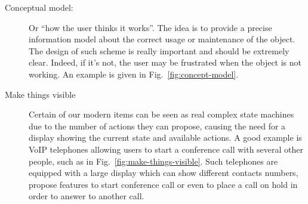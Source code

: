 \documentclass[a4paper,11pt] {article}
\theoremstyle{definition}
\begin{document}
\begin{description}
    \item [Conceptual model:] Or ``how the user thinks it works''. The idea is to provide a precise information model about the correct usage or maintenance of the object. The design of such scheme is really important and should be extremely clear. Indeed, if it's not, the user may be frustrated when the object is not working. An example is given in Fig.~\ref{fig:concept-model}.

    \item [Make things visible] Certain of our modern items can be seen as real complex state machines due to the number of actions they can propose, causing the need for a display showing the current state and available actions. A good example is VoIP telephones allowing users to start a conference call with several other people, such as in Fig.~\ref{fig:make-things-visible}. Such telephones are equipped with a large display which can show different contacts numbers, propose features to start conference call or even to place a call on hold in order to answer to another call.
\end{description}
\end{document}
